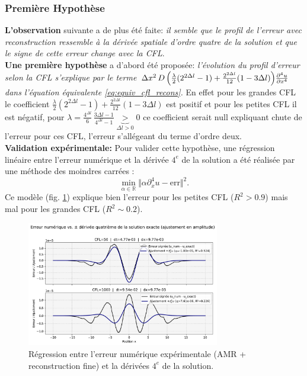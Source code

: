 \subsubsection{Première Hypothèse}
\textbf{L'observation} suivante a de plus été faite: \textit{il semble que le profil de l'erreur avec reconstruction ressemble à la dérivée spatiale d'ordre quatre
de la solution et que le signe de cette erreur change avec la CFL}.\\
\textbf{Une première hypothèse} a d'abord été proposée: \textit{l'évolution du profil d'erreur selon la CFL s'explique par le terme $\Delta x^{2}\, D \, \Bigl( 
        \frac{\lambda}{2} (2^{2 \Delta l} - 1) + \frac{2^{2 \Delta l} }{12} (1 - 3 \Delta l)
        \Bigr)\frac{\partial^{4}u}{\partial x^{4}}$ dans l'équation équivalente \eqref{eq:equiv_cfl_recons}.}
En effet pour les grandes CFL le coefficient $\frac{\lambda}{2} (2^{2 \Delta l} - 1) + \frac{2^{2 \Delta l} }{12} (1 - 3 \Delta l)$ est positif et pour les petites CFL il est négatif, pour $\lambda = \frac{4^{\Delta l}}{6}\,\frac{3 \Delta l - 1 }{4^{\Delta l}-1} \underbrace{>}_{\Delta l >0} 0$ ce coefficient serait null expliquant 
chute de l'erreur pour ces CFL, l'erreur s'allégeant du terme d'ordre deux.\\
\textbf{Validation expérimentale:} Pour valider cette hypothèse, une régression linéaire entre l'erreur numérique et la dérivée $4^e$ de la solution a été réalisée par 
une méthode des moindres carrées : $$\min_{\alpha \in \mathbb R} \Vert \alpha \partial_x^4 u - \text{err} \Vert^2.$$
Ce modèle (fig. \ref{fig:derive4_vs_err}) explique bien l'erreur pour les petites CFL ($R^2>0.9$) mais mal pour les grandes CFL ($R^2 \sim 0.2$).
\begin{figure}[htpb]
    \centering
    \includegraphics[width=0.75\textwidth]{media/4_travail/3/erreur_vs_deriv4.pdf}
    \caption{Régression entre l'erreur numérique expérimentale (AMR + reconstruction fine) et la dérivées $4^e$ de la solution.}
    \label{fig:derive4_vs_err}
\end{figure}

